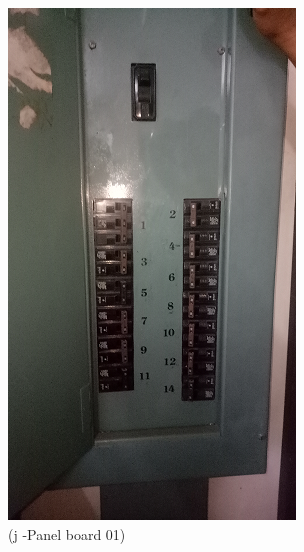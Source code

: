 \begin{figure}
\begin{minipage}[b]{0.22\linewidth}
	\includegraphics[width=\textwidth]{figures/asv_visual_panelboard}
	\caption*{(j -Panel board 01)}
\end{minipage}
	\hspace{0.03cm}
\begin{minipage}[b]{0.22\linewidth}

\end{minipage}
\end{figure}
